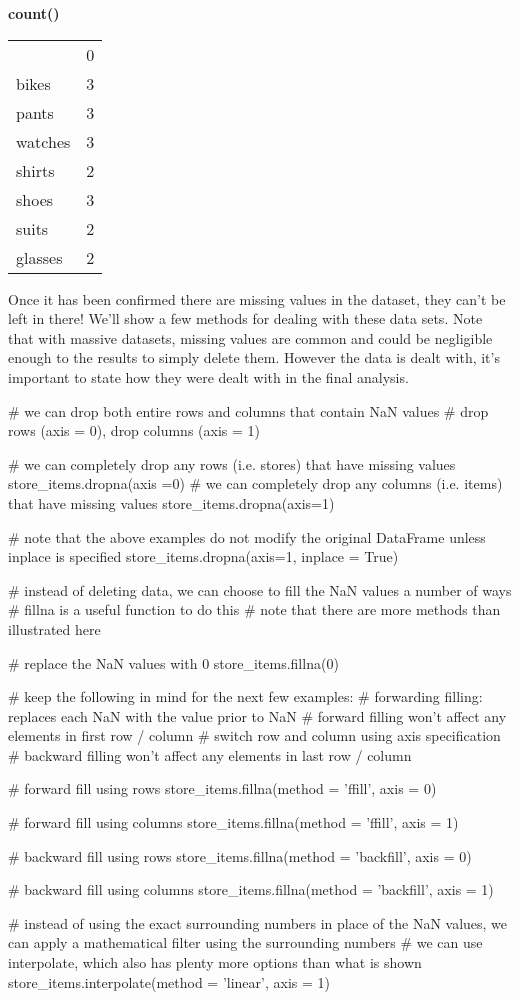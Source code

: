 \documentclass{article}
\begin{document}
\textbf{count()}
\begin{center}
	\begin{tabular}{lr}
		{} &  0 \\
		bikes   &  3 \\
		pants   &  3 \\
		watches &  3 \\
		shirts  &  2 \\
		shoes   &  3 \\
		suits   &  2 \\
		glasses &  2 \\
	\end{tabular}
\end{center}

Once it has been confirmed there are missing values in the dataset, they can't be left in there! We'll show a few methods for dealing with these data sets. Note that with massive datasets, missing values are common and could be negligible enough to the results to simply delete them. However the data is dealt with, it's important to state how they were dealt with in the final analysis.

\begin{python}
	# we can drop both entire rows and columns that contain NaN values
	# drop rows (axis = 0), drop columns (axis = 1)
	
	# we can completely drop any rows (i.e. stores) that have missing values
	store_items.dropna(axis =0)
	# we can completely drop any columns (i.e. items) that have missing values
	store_items.dropna(axis=1)
	
	# note that the above examples do not modify the original DataFrame unless inplace is specified
	store_items.dropna(axis=1, inplace = True)
	
	
	# instead of deleting data, we can choose to fill the NaN values a number of ways
	# fillna is a useful function to do this
	# note that there are more methods than illustrated here
	
	# replace the NaN values with 0
	store_items.fillna(0)
	
	# keep the following in mind for the next few examples:
	# forwarding filling: replaces each NaN with the value prior to NaN
	# forward filling won't affect any elements in first row / column
	# switch row and column using axis specification
	# backward filling won't affect any elements in last row / column
	
	# forward fill using rows
	store_items.fillna(method = 'ffill', axis = 0)
	
	# forward fill using columns
	store_items.fillna(method = 'ffill', axis = 1)
	
	# backward fill using rows
	store_items.fillna(method = 'backfill', axis = 0)
	
	# backward fill using columns
	store_items.fillna(method = 'backfill', axis = 1)
	
	
	# instead of using the exact surrounding numbers in place of the NaN values, we can apply a mathematical filter using the surrounding numbers
	# we can use interpolate, which also has plenty more options than what is shown
	store_items.interpolate(method = 'linear', axis = 1)
\end{python}
\end{document}
